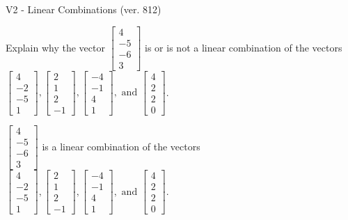 \begin{exercise}
  \begin{exerciseTitle}V2 - Linear Combinations (ver. 812)\end{exerciseTitle}
  \begin{exerciseStatement}
    Explain why the vector \(\left[\begin{array}{c}
4 \\
-5 \\
-6 \\
3
\end{array}\right]\)  is or is not a linear 
	combination of the vectors \(\left[\begin{array}{c}
4 \\
-2 \\
-5 \\
1
\end{array}\right] , \left[\begin{array}{c}
2 \\
1 \\
2 \\
-1
\end{array}\right] , \left[\begin{array}{c}
-4 \\
-1 \\
4 \\
1
\end{array}\right] , \text{ and } \left[\begin{array}{c}
4 \\
2 \\
2 \\
0
\end{array}\right]\).
	


  \end{exerciseStatement}
  \begin{exerciseAnswer}
   \(\left[\begin{array}{c}
4 \\
-5 \\
-6 \\
3
\end{array}\right]\) 
  	 is  
	a linear combination of the vectors \(\left[\begin{array}{c}
4 \\
-2 \\
-5 \\
1
\end{array}\right] , \left[\begin{array}{c}
2 \\
1 \\
2 \\
-1
\end{array}\right] , \left[\begin{array}{c}
-4 \\
-1 \\
4 \\
1
\end{array}\right] , \text{ and } \left[\begin{array}{c}
4 \\
2 \\
2 \\
0
\end{array}\right]\).


\end{exerciseAnswer}
\end{exercise}
